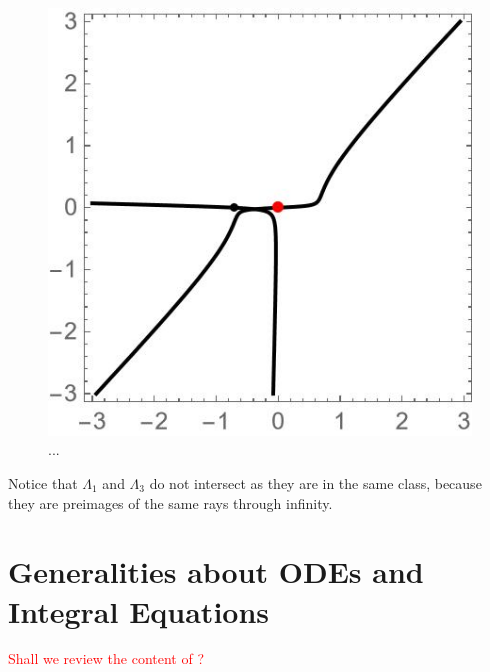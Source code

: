 \documentclass{article}
\theoremstyle{definition}
\theoremstyle{plain}
\begin{document}
\begin{figure}[ht]
     \includegraphics[scale=0.4]{figures/contour--AL4--12--inter.jpg}
    \caption{...}
    \label{fig:intersection_thimbles-AL4}
\end{figure}
Notice that $\Lambda_1$ and $\Lambda_3$ do not intersect as they are in the same class, because they are preimages of the same rays through infinity.    
\section{Generalities about ODEs and Integral Equations}\label{apx:generalities_ODEs}
\textcolor{red}{Shall we review the content of \cite{reg-sing-volterra}?}
\end{document}
